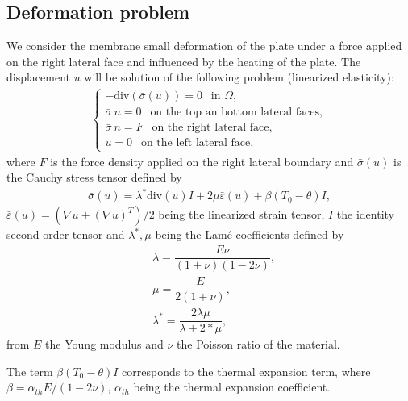 \documentclass[a4paper,11pt,english]{sphinxmanual}
\begin{document}
\subsection{Deformation problem}
\label{\detokenize{tutorial/thermo_coupling:deformation-problem}}
\sphinxAtStartPar
We consider the membrane small deformation of the plate under a force applied on the right lateral face and influenced by the heating of the plate. The displacement \(u\) will be solution of the following problem (linearized elasticity):
\begin{equation*}
\begin{split} \left\{\begin{array}{l}
-\mbox{div}(\bar{\sigma}(u)) = 0 ~~ \mbox{ in } \Omega, \\
\bar{\sigma}\ n = 0 ~~ \mbox{ on the top an bottom lateral faces}, \\
\bar{\sigma}\ n = F ~~ \mbox{ on the right lateral face}, \\
u = 0 ~~ \mbox{ on the left lateral face},
\end{array} \right.\end{split}
\end{equation*}
\sphinxAtStartPar
where \(F\) is the force density applied on the right lateral boundary and \(\bar{\sigma}(u)\) is the Cauchy stress tensor defined by
\begin{equation*}
\begin{split}\bar{\sigma}(u) = \lambda^* \mbox{div}(u) I + 2\mu \bar{\varepsilon}(u) + \beta(T_0-\theta) I,\end{split}
\end{equation*}
\sphinxAtStartPar
\(\bar{\varepsilon}(u) = (\nabla u + (\nabla u)^T)/2\) being the linearized strain tensor, \(I\) the identity second order tensor and \(\lambda^*, \mu\) being the Lamé coefficients defined  by
\begin{equation*}
\begin{split}&\lambda = \dfrac{E\nu}{(1+\nu)(1-2\nu)}, \\
&\mu = \dfrac{E}{2(1+\nu)}, \\
&\lambda^* = \dfrac{2\lambda\mu}{\lambda+2*\mu},\end{split}
\end{equation*}
\sphinxAtStartPar
from \(E\) the Young modulus and \(\nu\) the Poisson ratio of the material.

\sphinxAtStartPar
The term \(\beta(T_0-\theta) I\) corresponds to the thermal expansion term, where \(\beta = \alpha_{th} E/(1-2\nu)\), \(\alpha_{th}\) being the thermal expansion coefficient.
\end{document}
